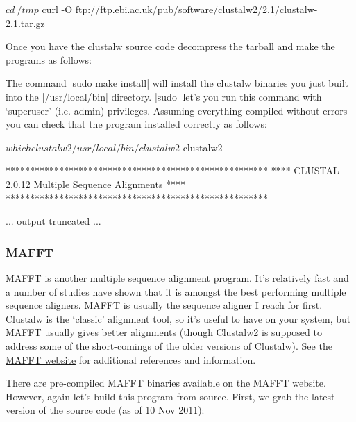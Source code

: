 \begin{bash}
$ cd ~/tmp
$ curl -O ftp://ftp.ebi.ac.uk/pub/software/clustalw2/2.1/clustalw-2.1.tar.gz 
\end{bash}
%
Once you have the clustalw source code decompress the tarball and make the programs as follows:
%
%
The command |sudo make install| will install the clustalw binaries you just built into the |/usr/local/bin| directory. |sudo| let's you run this command with `superuser' (i.e. admin) privileges.  Assuming everything compiled without errors you can check that the program installed correctly as follows:

\begin{bash}
$ which clustalw2
/usr/local/bin/clustalw2

$ clustalw2

******************************************************
**** CLUSTAL 2.0.12 Multiple Sequence Alignments  ****
******************************************************
 
     ... output truncated ...
\end{bash}


\subsubsection{MAFFT}

MAFFT is another multiple sequence alignment program. It's relatively fast and a number of studies have shown that it is amongst the best performing multiple sequence aligners. MAFFT is usually the sequence aligner I reach for first.  Clustalw is the `classic' alignment tool, so it's useful to have on your system, but MAFFT usually gives better alignments (though Clustalw2 is supposed to address some of the short-comings of the older versions of Clustalw). See the \href{http://mafft.cbrc.jp/alignment/software/}{MAFFT website} for additional references and information.

There are pre-compiled MAFFT binaries available on the MAFFT website. However, again let's build this program from source. First, we grab the latest version of the source code (as of 10 Nov 2011):

